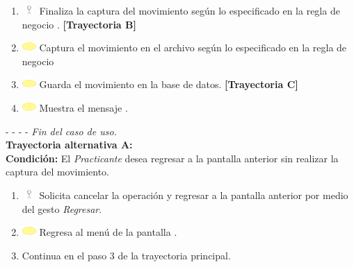 \begin{enumerate}
	\item \includegraphics[width=15pt, height=10pt]{./Figuras/iconosCU/usuario.png} Finaliza la captura del movimiento según lo especificado en la regla de negocio . \textbf{[Trayectoria B]}
	\item \includegraphics[width=15pt]{./Figuras/iconosCU/herramienta.png} Captura el movimiento en el archivo según lo especificado en la regla de negocio 
	\item \includegraphics[width=15pt]{./Figuras/iconosCU/herramienta.png} Guarda el movimiento en la base de datos. \textbf{[Trayectoria C]}
	\item \includegraphics[width=15pt]{./Figuras/iconosCU/herramienta.png} Muestra el mensaje .
\end{enumerate}
	
- - - - \textit{Fin del caso de uso.} \\


\textbf{\large{Trayectoria alternativa A:}}\\
\textbf{Condición: } El \textit{Practicante} desea regresar a la pantalla anterior sin realizar la captura del movimiento.

\begin{enumerate}
	\item \includegraphics[width=15pt, height=10pt]{./Figuras/iconosCU/usuario.png} Solicita cancelar la operación y regresar a la pantalla anterior por medio del gesto \textit{Regresar}.
	\item \includegraphics[width=15pt]{./Figuras/iconosCU/herramienta.png} Regresa al menú de la pantalla .
	\item Continua en el paso 3 de la trayectoria principal.
\end{enumerate}

